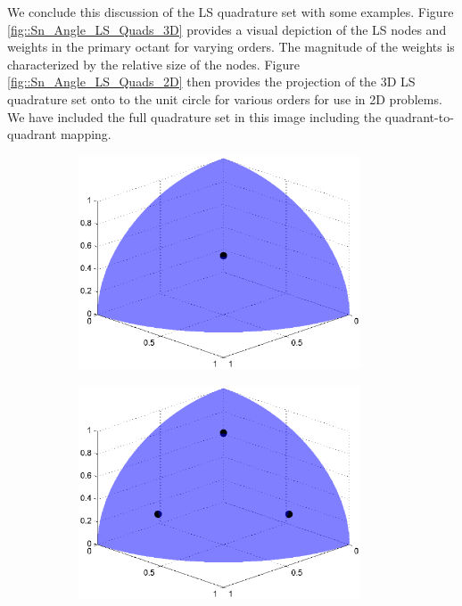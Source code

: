 We conclude this discussion of the LS quadrature set with some examples. Figure \ref{fig::Sn_Angle_LS_Quads_3D} provides a visual depiction of the LS nodes and weights in the primary octant for varying orders. The magnitude of the weights is characterized by the relative size of the nodes. Figure \ref{fig::Sn_Angle_LS_Quads_2D} then provides the projection of the 3D LS quadrature set onto to the unit circle for various orders for use in 2D problems. We have included the full quadrature set in this image including the quadrant-to-quadrant mapping. 

\begin{figure}
\centering
	\begin{subfigure}[b]{0.48\textwidth}
		\centering
		\includegraphics[width=0.92\textwidth]{figures/sec_Sn/LS2_3D.eps}
		\caption{}
	\end{subfigure}
	\hfill
	\begin{subfigure}[b]{0.48\textwidth}
		\centering
		\includegraphics[width=0.92\textwidth]{figures/sec_Sn/LS4_3D.eps}

\end{subfigure}
\end{figure}
